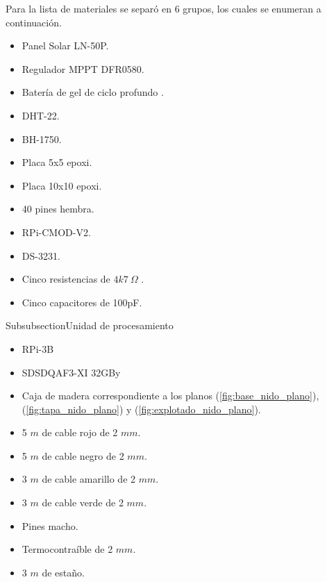 Para la lista de materiales se separó en 6 grupos, los cuales se enumeran a continuación.

\begin{itemize}
	\item Panel Solar LN-50P.
	\item Regulador MPPT DFR0580.
	\item Batería de gel de ciclo profundo \TBD.
\end{itemize}

\begin{itemize}
	\item DHT-22.
	\item BH-1750.
	\item Placa 5x5 epoxi.
	\item Placa 10x10 epoxi.
	\item 40 pines hembra.
	\item RPi-CMOD-V2.
	\item DS-3231.
	\item Cinco resistencias de $4k7 \ \Omega$ .
	\item Cinco capacitores de 100pF.
\end{itemize}

Subsubsection{Unidad de procesamiento}
\begin{itemize}
	\item RPi-3B
	\item SDSDQAF3-XI 32GBy
\end{itemize}

\begin{itemize}
	\item Caja de madera correspondiente a los planos (\ref{fig:base_nido_plano}), (\ref{fig:tapa_nido_plano}) y (\ref{fig:explotado_nido_plano}).
\end{itemize}

\begin{itemize}
	\item 5 $m$ de cable rojo de 2 $mm$.
	\item 5 $m$ de cable negro de 2 $mm$.
	\item 3 $m$ de cable amarillo de 2 $mm$.
	\item 3 $m$ de cable verde de 2 $mm$.
	\item Pines macho.
	\item Termocontraíble de 2 $mm$.
	\item 3 $m$ de estaño.
\end{itemize}









